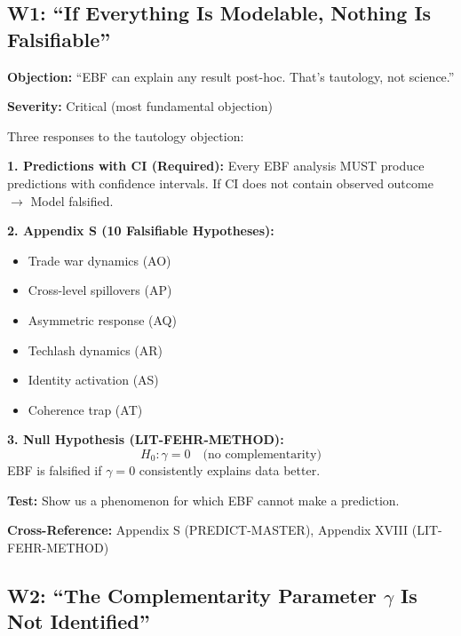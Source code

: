 \subsection{W1: ``If Everything Is Modelable, Nothing Is Falsifiable''}
\label{sec:da-w1}

\begin{tcolorbox}[colback=gray!5!white, colframe=gray!75!black]
\textbf{Objection:} ``EBF can explain any result post-hoc. That's tautology, not science.''

\textbf{Severity:} Critical (most fundamental objection)
\end{tcolorbox}

\begin{axiom}
Three responses to the tautology objection:

\textbf{1. Predictions with CI (Required):}
Every EBF analysis MUST produce predictions with confidence intervals.
If CI does not contain observed outcome $\rightarrow$ Model falsified.

\textbf{2. Appendix S (10 Falsifiable Hypotheses):}
\begin{itemize}[nosep]
    \item Trade war dynamics (AO)
    \item Cross-level spillovers (AP)
    \item Asymmetric response (AQ)
    \item Techlash dynamics (AR)
    \item Identity activation (AS)
    \item Coherence trap (AT)
\end{itemize}

\textbf{3. Null Hypothesis (LIT-FEHR-METHOD):}
\begin{equation}
H_0: \gamma = 0 \quad \text{(no complementarity)}
\end{equation}
EBF is falsified if $\gamma = 0$ consistently explains data better.

\textbf{Test:} Show us a phenomenon for which EBF cannot make a prediction.
\end{axiom}

\textbf{Cross-Reference:} Appendix S (PREDICT-MASTER), Appendix XVIII (LIT-FEHR-METHOD)

\subsection{W2: ``The Complementarity Parameter $\gamma$ Is Not Identified''}
\label{sec:da-w2}

